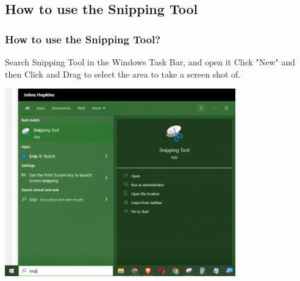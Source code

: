 \documentclass{beamer}
\begin{document}
\subsection{How to use the Snipping Tool}
	\begin{frame}
	\frametitle{How to use the Snipping Tool?}
	\begin{outline}
		\1 Search Snipping Tool in the Windows Task Bar, and open it
		\1 Click "New" and then Click and Drag to select the area to take a screen shot of.
	\end{outline}
	\begin{center}
		\includegraphics[width = 0.75\textwidth]{images/using snipping tool.png}
	\end{center}
\end{frame}

	\section{}	
\end{document}
